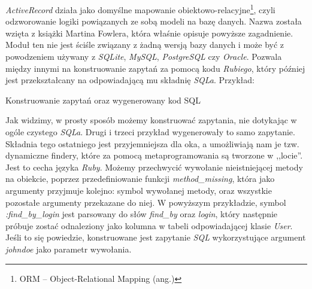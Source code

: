 \documentclass[a4paper,12pt]{article}
\begin{document}
\emph{ActiveRecord} działa jako domyślne mapowanie
obiektowo-relacyjne\footnote{ORM -- Object-Relational Mapping (ang.)},
czyli odzworowanie logiki powiązanych ze sobą modeli na bazę danych.
Nazwa została wzięta z książki Martina Fowlera\cite{martin-fowler}, która
właśnie opisuje powyższe zagadnienie. Moduł ten nie jest ściśle związany z żadną
wersją bazy danych i może być z powodzeniem używany z \emph{SQLite},
\emph{MySQL}, \emph{PostgreSQL} czy \emph{Oracle}. Pozwala między innymi na
konstruowanie zapytań za pomocą kodu \emph{Rubiego}, który później jest
przekształcany na odpowiadającą mu składnię \emph{SQLa}.
Przykład:
\begin{listing}
  
  \caption{Konstruowanie zapytań oraz wygenerowany kod SQL}
  \label{listing:activerecord_finders}
\end{listing}


Jak widzimy, w prosty sposób możemy konstruować zapytania, nie dotykając w ogóle
czystego \emph{SQLa}. Drugi i trzeci przykład wygenerowały to samo zapytanie.
Składnia tego ostatniego jest przyjemniejsza dla oka, a umożliwiają nam je tzw.
dynamiczne findery, które za pomocą metaprogramowania są tworzone w ,,locie''.
Jest to cecha języka \emph{Ruby}. Możemy przechwycić wywołanie nieistniejącej
metody na obiekcie, poprzez przedefiniowanie funkcji \emph{method\_missing},
która jako argumenty przyjmuje kolejno: symbol wywołanej metody, oraz wszystkie
pozostałe argumenty przekazane do niej. W powyższym przykładzie, symbol
\emph{:find\_by\_login} jest parsowany do słów \emph{find\_by} oraz \emph{login}, który
następnie próbuje zostać odnaleziony jako kolumna w tabeli odpowiadającej klasie
\emph{User}. Jeśli to się powiedzie, konstruowane jest zapytanie \emph{SQL}
wykorzystujące argument \emph{johndoe} jako parametr wywołania.


\clearpage
\end{document}
